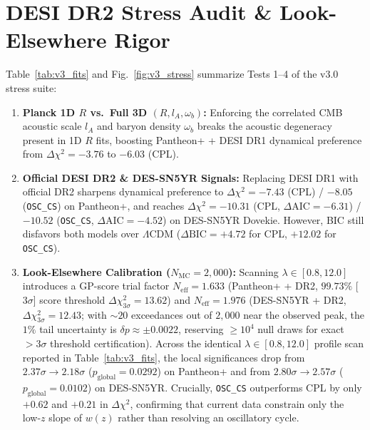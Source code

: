 \documentclass[10pt,twocolumn,a4paper]{article}
\begin{document}
\section{DESI DR2 Stress Audit \& Look-Elsewhere Rigor}
Table~\ref{tab:v3_fits} and Fig.~\ref{fig:v3_stress} summarize Tests 1--4 of the v3.0 stress suite:
\begin{enumerate}
\item \textbf{Planck 1D $R$ vs.\ Full 3D $(R, l_A, \omega_b)$:} Enforcing the correlated CMB acoustic scale $l_A$ and baryon density $\omega_b$ breaks the acoustic degeneracy present in 1D $R$ fits, boosting Pantheon+ + DESI DR1 dynamical preference from $\Delta\chi^2 = -3.76$ to $-6.03$ (CPL).
\item \textbf{Official DESI DR2 \& DES-SN5YR Signals:} Replacing DESI DR1 with official DR2 sharpens dynamical preference to $\Delta\chi^2 = -7.43$ (CPL) / $-8.05$ (\texttt{OSC\_CS}) on Pantheon+, and reaches $\Delta\chi^2 = -10.31$ (CPL, $\Delta\mathrm{AIC} = -6.31$) / $-10.52$ (\texttt{OSC\_CS}, $\Delta\mathrm{AIC} = -4.52$) on DES-SN5YR Dovekie. However, BIC still disfavors both models over $\Lambda\mathrm{CDM}$ ($\Delta\mathrm{BIC} = +4.72$ for CPL, $+12.02$ for \texttt{OSC\_CS}).
\item \textbf{Look-Elsewhere Calibration ($N_{\mathrm{MC}} = 2,000$):} Scanning $\lambda \in [0.8, 12.0]$ introduces a GP-score trial factor $N_{\mathrm{eff}} = 1.633$ (Pantheon+ + DR2, $99.73\%$ [$3\sigma$] score threshold $\Delta\chi^2_{3\sigma} = 13.62$) and $N_{\mathrm{eff}} = 1.976$ (DES-SN5YR + DR2, $\Delta\chi^2_{3\sigma} = 12.43$; with $\sim 20$ exceedances out of $2,000$ near the observed peak, the $1\%$ tail uncertainty is $\delta p \approx \pm 0.0022$, reserving $\ge 10^4$ null draws for exact $>3\sigma$ threshold certification). Across the identical $\lambda \in [0.8, 12.0]$ profile scan reported in Table~\ref{tab:v3_fits}, the local significances drop from $2.37\sigma \to 2.18\sigma$ ($p_{\mathrm{global}} = 0.0292$) on Pantheon+ and from $2.80\sigma \to 2.57\sigma$ ($p_{\mathrm{global}} = 0.0102$) on DES-SN5YR. Crucially, \texttt{OSC\_CS} outperforms CPL by only $+0.62$ and $+0.21$ in $\Delta\chi^2$, confirming that current data constrain only the low-$z$ slope of $w(z)$ rather than resolving an oscillatory cycle.

\end{enumerate}
\end{document}
